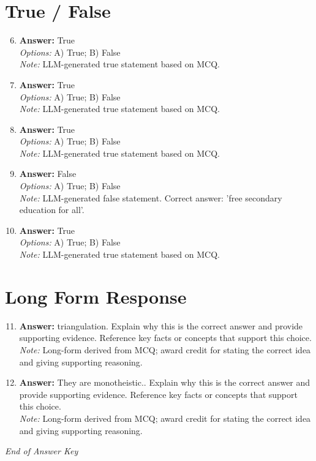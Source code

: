 \documentclass[12pt]{article}
\begin{document}
\section*{True / False}
\begin{enumerate}[label=\arabic*.]
\setcounter{enumi}{5}
\item \textbf{Answer:} True
\\ \textit{Options:} A) True; B) False
\\ \textit{Note:} LLM-generated true statement based on MCQ.
\item \textbf{Answer:} True
\\ \textit{Options:} A) True; B) False
\\ \textit{Note:} LLM-generated true statement based on MCQ.
\item \textbf{Answer:} True
\\ \textit{Options:} A) True; B) False
\\ \textit{Note:} LLM-generated true statement based on MCQ.
\item \textbf{Answer:} False
\\ \textit{Options:} A) True; B) False
\\ \textit{Note:} LLM-generated false statement. Correct answer: 'free secondary education for all'.
\item \textbf{Answer:} True
\\ \textit{Options:} A) True; B) False
\\ \textit{Note:} LLM-generated true statement based on MCQ.
\end{enumerate}

\section*{Long Form Response}
\begin{enumerate}[label=\arabic*.]
\setcounter{enumi}{10}
\item \textbf{Answer:} triangulation. Explain why this is the correct answer and provide supporting evidence. Reference key facts or concepts that support this choice.
\\ \textit{Note:} Long-form derived from MCQ; award credit for stating the correct idea and giving supporting reasoning.
\item \textbf{Answer:} They are monotheistic.. Explain why this is the correct answer and provide supporting evidence. Reference key facts or concepts that support this choice.
\\ \textit{Note:} Long-form derived from MCQ; award credit for stating the correct idea and giving supporting reasoning.
\end{enumerate}

\vfill
\noindent\textit{End of Answer Key}
\end{document}
